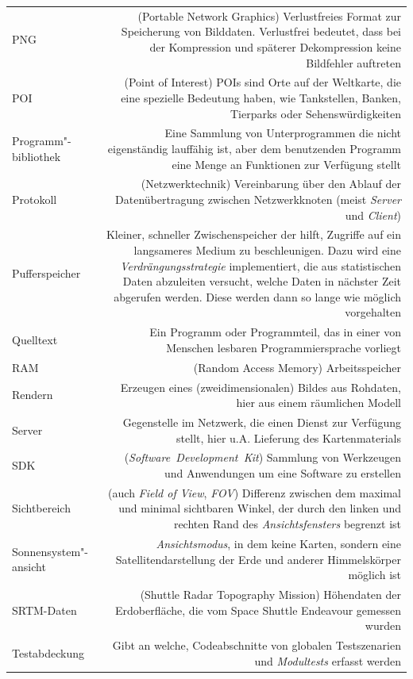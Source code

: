 \documentclass[10pt]{scrreprt}
\newcommand{\textref}[1]{\mbox{\raisebox{0.1ex}{\small$\rightarrow$ }\textit{#1}}}
\begin{document}
\begin{longtabu}{L{0.35} R{1.65}}
PNG & (Portable Network Graphics) Verlustfreies Format zur Speicherung von Bilddaten. Verlustfrei bedeutet, dass bei der Kompression und späterer Dekompression keine Bildfehler auftreten\\
POI & (Point of Interest) POIs sind Orte auf der Weltkarte, die eine spezielle Bedeutung haben, wie Tankstellen, Banken, Tierparks oder Sehenswürdigkeiten\\
Programm"-bibliothek & Eine Sammlung von Unterprogrammen die nicht eigenständig lauffähig ist, aber dem benutzenden Programm eine Menge an Funktionen zur Verfügung stellt\\
Protokoll & (Netzwerktechnik) Vereinbarung über den Ablauf der Datenübertragung zwischen Netzwerkknoten (meist \textref{Server} und \textref{Client})\\
Pufferspeicher & Kleiner, schneller Zwischenspeicher der hilft, Zugriffe auf ein langsameres Medium zu beschleunigen. Dazu wird eine \textit{Verdrängungsstrategie} implementiert, die aus statistischen Daten abzuleiten versucht, welche Daten in nächster Zeit abgerufen werden. Diese werden dann so lange wie möglich vorgehalten\\
Quelltext & Ein Programm oder Programmteil, das in einer von Menschen lesbaren Programmiersprache vorliegt\\
RAM & (Random Access Memory) Arbeitsspeicher\\
Rendern & Erzeugen eines (zweidimensionalen) Bildes aus Rohdaten, hier aus einem räumlichen Modell\\
Server & Gegenstelle im Netzwerk, die einen Dienst zur Verfügung stellt, hier u.A. Lieferung des Kartenmaterials\\
SDK & (\textref{Software Development Kit}) Sammlung von Werkzeugen und Anwendungen um eine Software zu erstellen\\
Sichtbereich & (auch \textit{Field of View}, \textit{FOV}) Differenz zwischen dem maximal und minimal sichtbaren Winkel, der durch den linken und rechten Rand des \textref{Ansichtsfensters} begrenzt ist\\
Sonnensystem"-ansicht & \textref{Ansichtsmodus}, in dem keine Karten, sondern eine Satellitendarstellung der Erde und anderer Himmelskörper möglich ist\\
SRTM-Daten & (Shuttle Radar Topography Mission) Höhendaten der Erdoberfläche, die vom Space Shuttle Endeavour gemessen wurden\\
Testabdeckung & Gibt an welche, Codeabschnitte von globalen Testszenarien und \textref{Modultests} erfasst werden \\

\end{longtabu}
\end{document}
